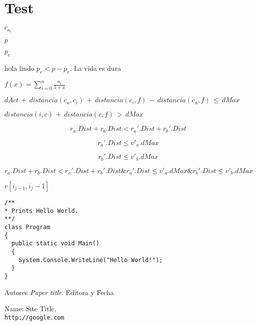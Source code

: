 
\chapter{Test}

$c_{a_i}$

$p$

$p_e$

hola lindo $p_e < p - p_e$. La vida es dura

\( f(x) = \sum_{i=0}^{n} \frac{a_i}{1+x} \)

\( dAct\, +\, distancia(c_u, c_i)\, +\, distancia(c_i, f)\, -\, distancia(c_u, f)\, \leq\, dMax\)

\( distancia(i, c)\, +\, distancia(c, f)\, >\, dMax\)


\begin{equation*}
r_a.Dist + r_b.Dist < r_a'.Dist + r_b'.Dist \nonumber
\end{equation*}

\begin{equation*}
r_a'.Dist \leq v'_a.dMax
\end{equation*}

\begin{equation*}
r_b'.Dist \leq v'_b.dMax
\end{equation*}

\( r_a.Dist + r_b.Dist < r_a'.Dist + r_b'.Dist \& r_a'.Dist \leq v'_a.dMax \& r_b'.Dist \leq v'_b.dMax \)

$v[i_{j-1}, i_j-1]$

\begin{lstlisting}
/**
* Prints Hello World.
**/
class Program
{
  public static void Main()
  {
    System.Console.WriteLine("Hello World!");
  }
}
\end{lstlisting}


Autores
\textit{Paper title}. 
Editora y Fecha
 
Name: Site Title,
\\\texttt{http://google.com}